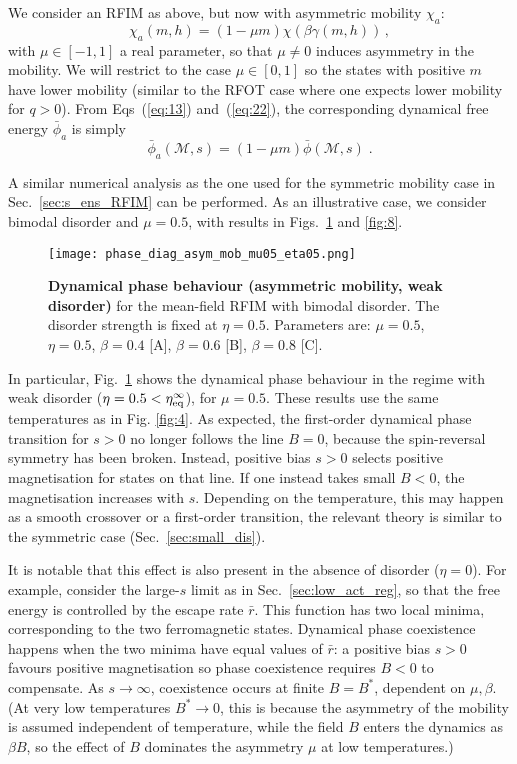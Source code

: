 \documentclass{iopart}
\newcommand{\eqref}[1]{(\ref{#1})}
\newcommand{\mdis}[0]{\ensuremath{\mathcal{M}}}
\begin{document}
We consider an RFIM as above, but now with
asymmetric mobility $\chi_{a}$:
\begin{equation}
  \label{eq:8}
  \chi_{a}(m,h) = (1 - \mu m ) \chi(\beta \gamma(m,h)) \, ,
\end{equation}
with $\mu\in[-1,1]$ a real parameter, so that $\mu \neq 0$ induces asymmetry in the mobility.  We will restrict to the case $\mu\in [0,1]$ so the states with positive $m$ have lower mobility (similar to the RFOT case where one expects lower mobility for $q>0$).
%
From Eqs~\eqref{eq:13} and~\eqref{eq:22}, the corresponding dynamical free energy $\bar{\phi}_{a}$ is simply
\begin{equation}
  \label{eq:1}
\bar{\phi}_{a}(\mdis, s) = (1-\mu m)\bar{\phi}(\mdis,s) \;.   
\end{equation}

A similar numerical analysis as the one used for the symmetric mobility case in Sec.~\ref{sec:s_ens_RFIM} can be performed.
As an illustrative case, we consider bimodal disorder and $\mu=0.5$, with results in
Figs.~\ref{fig:7} and \ref{fig:8}.


\begin{figure}
  \centering
  \texttt{[image: phase\_diag\_asym\_mob\_mu05\_eta05.png]} 
  \caption{\textbf{Dynamical phase behaviour (asymmetric mobility, weak disorder)} for the mean-field RFIM with bimodal disorder. The disorder strength is fixed at $\eta=0.5$. Parameters are:  $\mu=0.5$,  $\eta=0.5$, $\beta=0.4$ [A], $\beta=0.6$ [B], $\beta=0.8$ [C].
}
  \label{fig:7}
\end{figure}


In particular, 
Fig.~\ref{fig:7} shows the dynamical phase behaviour in the regime with weak disorder ($\eta=0.5<\eta_{\rm eq}^{\infty}$), for $\mu=0.5$. 
These results 
use the same temperatures as in Fig. \ref{fig:4}. 
As expected, the first-order dynamical phase transition for $s>0$ no longer follows the line $B=0$, because the spin-reversal symmetry has been broken.  Instead, positive bias $s>0$ selects positive magnetisation for states on that line.  If one instead takes small $B<0$, the magnetisation increases with $s$.  Depending on the temperature, this may happen as a smooth crossover or a first-order transition, the relevant theory is similar to the symmetric case (Sec.~\ref{sec:small_dis}).

It is notable that this effect is also present in the absence of disorder ($\eta=0$).   For example, consider the large-$s$ limit as in Sec.~\ref{sec:low_act_reg}, so that the free energy is controlled by the escape rate $\bar{r}$.  This function has two local minima, corresponding to the two ferromagnetic states.  Dynamical phase coexistence happens when the two minima have equal values of $\bar{r}$: a positive bias $s>0$ favours positive magnetisation so phase coexistence requires $B<0$ to compensate.  As $s\to\infty$, coexistence occurs at finite $B=B^*$, dependent on $\mu,\beta$.  (At very low temperatures $B^*\to0$, this is because the asymmetry of the mobility is assumed independent of temperature, while the field $B$ enters the dynamics as $\beta B$, so the effect of $B$ dominates the asymmetry $\mu$ at low temperatures.)
\end{document}
